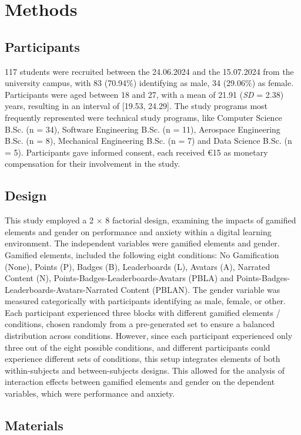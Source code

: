 \section{Methods}
\subsection{Participants}
117 students were recruited between the 24.06.2024 and the 15.07.2024 from the university campus, with 83 (70.94\%) identifying as male, 34 (29.06\%) as female.
Participants were aged between 18 and 27, with a mean of 21.91 (\textit{SD} = 2.38) years, resulting in an interval of [19.53, 24.29].
The study programs most frequently represented were technical study programs, like Computer Science B.Sc. (n = 34), Software Engineering B.Sc. (n = 11), Aerospace Engineering B.Sc. (n = 8), Mechanical Engineering B.Sc. (n = 7) and Data Science B.Sc. (n = 5).
Participants gave informed consent, each received €15 as monetary compensation for their involvement in the study.

\subsection{Design}
This study employed a 2 $\times$ 8 factorial design, examining the impacts of gamified elements and gender on performance and anxiety within a digital learning environment.
The independent variables were gamified elements and gender.
Gamified elements, included the following eight conditions: No Gamification (None), Points (P), Badges (B), Leaderboards (L), Avatars (A), Narrated Content (N), Points-Badges-Leaderboards-Avatars (PBLA) and Points-Badges-Leaderboards-Avatars-Narrated Content (PBLAN).
The gender variable was measured categorically with participants identifying as male, female, or other.
Each participant experienced three blocks with different gamified elements / conditions, chosen randomly from a pre-generated set to ensure a balanced distribution across conditions.
However, since each participant experienced only three out of the eight possible conditions, and different participants could experience different sets of conditions, this setup integrates elements of both within-subjects and between-subjects designs.
This allowed for the analysis of interaction effects between gamified elements and gender on the dependent variables, which were performance and anxiety.

\subsection{Materials}
